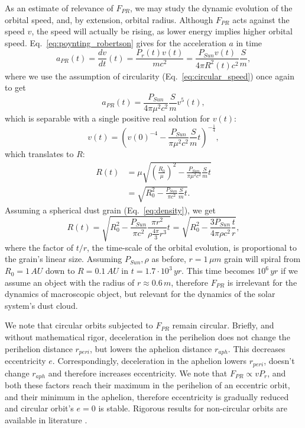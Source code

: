 As an estimate of relevance of $F_{PR}$, we may study the dynamic evolution of the orbital speed, and, by extension, orbital radius. Although $F_{PR}$ acts against the speed $v$, the speed will actually be rising, as lower energy implies higher orbital speed. Eq.~\ref{eq:poynting_robertson} gives for the acceleration $a$ in time
\begin{equation}
    a_{PR}(t) = \frac{dv}{dt}(t) = \frac{P_{r}(t)v(t)}{mc^2} = \frac{P_{Sun} v(t) }{4 \pi R^2(t) c^2} \frac{S}{m},
\end{equation}
where we use the assumption of circularity (Eq.~\ref{eq:circular_speed}) once again to get
\begin{equation}
    a_{PR}(t) = \frac{P_{Sun}}{4 \pi \mu^2 c^2} \frac{S}{m} v^5(t),
\end{equation}
which is separable with a single positive real solution for $v(t)$:
\begin{equation}
    v(t) = \left( v(0)^{-4} - \frac{P_{Sun}}{\pi \mu^2 c^2} \frac{S}{m} t \right)^{-\frac{1}{4}},
\end{equation}
which translates to $R$:
\begin{equation}\begin{split}
    R(t) &=  \mu \sqrt{ \left(\frac{R_0}{\mu}\right)^{2} - \frac{P_{Sun}}{\pi \mu^2 c^2} \frac{S}{m} t }
    \\ &= \sqrt{R_0^2 - \frac{P_{Sun}}{\pi c^2} \frac{S}{m} t }.
\end{split}\end{equation}
Assuming a spherical dust grain (Eq.~\ref{eq:density}), we get
\begin{equation}
    R(t) = \sqrt{R_0^2 - \frac{P_{Sun}}{\pi c^2} \frac{\pi r^2}{\rho \frac{4\pi}{3} r^3} t } = \sqrt{R_0^2 - \frac{3P_{Sun}}{4 \pi \rho c^2} \frac{t}{r} },
    \label{eq:PR_estimate}
\end{equation}
where the factor of $t/r$, the time-scale of the orbital evolution, is proportional to the grain's linear size. Assuming $P_{Sun},\rho$ as before, $r=1\,\si{\mu m}$ grain will spiral from $R_0=1\,\si{AU}$ down to $R=0.1\,\si{AU}$ in $t=1.7 \cdot 10^3\,\si{yr}$. This time becomes $10^6\,\si{yr}$ if we assume an object with the radius of $r \approx 0.6 \, \si{m}$, therefore $F_{PR}$ is irrelevant for the dynamics of macroscopic object, but relevant for the dynamics of the solar system's dust cloud. 

We note that circular orbits subjected to $F_{PR}$ remain circular. Briefly, and without mathematical rigor, deceleration in the perihelion does not change the perihelion distance $r_{peri}$, but lowers the aphelion distance $r_{aph}$. This decreases eccentricity $e$. Correspondingly, deceleration in the aphelion lowers $r_{peri}$, doesn't change $r_{aph}$ and therefore increases eccentricity. We note that $F_{PR} \propto v P_r$, and both these factors reach their maximum in the perihelion of an eccentric orbit, and their minimum in the aphelion, therefore eccentricity is gradually reduced and circular orbit's $e=0$ is stable. Rigorous results for non-circular orbits are available in literature \citep{wyatt1950poynting}. 

